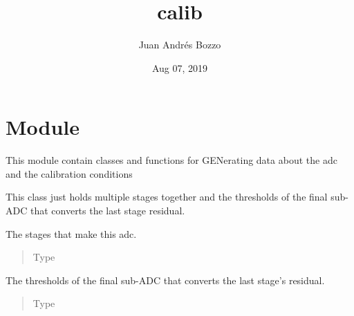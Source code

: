 \documentclass[letterpaper,10pt,english]{sphinxmanual}
\title{calib}
\date{Aug 07, 2019}
\author{Juan Andrés Bozzo}
\begin{document}
\pagestyle{empty}
\sphinxmaketitle
\pagestyle{plain}
\sphinxtableofcontents
\pagestyle{normal}
\label{\detokenize{index::doc}}



\chapter{ Module}
\label{\detokenize{gen:gen-module}}\label{\detokenize{gen::doc}}
This module contain classes and functions for GENerating data about
the adc and the calibration conditions

\label{\detokenize{gen:module-calib.gen}}

\begin{fulllineitems}
\label{\detokenize{gen:calib.gen.PipeParameters}}
This class just holds multiple stages together and the thresholds of the
final sub-ADC that converts the last stage residual.

\begin{fulllineitems}
\label{\detokenize{gen:calib.gen.PipeParameters.stages}}
The stages that make this adc.
\begin{quote}\begin{description}
\item[{Type}] \leavevmode
{}

\end{description}\end{quote}

\end{fulllineitems}


\begin{fulllineitems}
\label{\detokenize{gen:calib.gen.PipeParameters.tail}}
The thresholds of the final sub-ADC that converts the last stage’s
residual.
\begin{quote}\begin{description}
\item[{Type}] \leavevmode
{}

\end{description}\end{quote}

\end{fulllineitems}


\end{fulllineitems}
\end{document}
